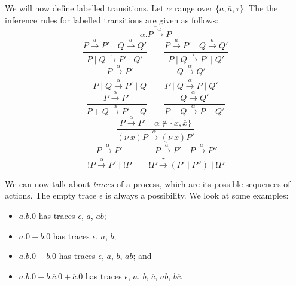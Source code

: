 \documentclass[a4paper, openany]{memoir}
\theoremstyle{definition}
\begin{document}
    We will now define labelled transitions. Let $\alpha$ range over $\{a, \overline{a}, \tau\}$. The the inference rules for labelled transitions are given as follows:
    \[\overline{\alpha.P \xrightarrow{\alpha} P}\]
    \[\frac{P \xrightarrow{a} P' \quad Q \xrightarrow{\overline{a}} Q'}{P \mid Q \xrightarrow{\tau} P' \mid Q'} \qquad \frac{P \xrightarrow{\overline{a}} P' \quad Q \xrightarrow{a} Q'}{P \mid Q \xrightarrow{\tau} P' \mid Q'}\]
    \[\frac{P \xrightarrow{\alpha} P'}{P \mid Q \xrightarrow{\alpha} P' \mid Q} \qquad \frac{Q \xrightarrow{\alpha} Q'}{P \mid Q \xrightarrow{\alpha} P \mid Q'}\]
    \[\frac{P \xrightarrow{\alpha} P'}{P + Q \xrightarrow{\alpha} P' + Q} \qquad \frac{Q \xrightarrow{\alpha} Q'}{P + Q \xrightarrow{\alpha} P + Q'}\]
    \[\frac{P \xrightarrow{\alpha} P' \quad \alpha \not\in \{x, \overline{x}\}}{(\nu \ x)P \xrightarrow{\alpha} (\nu \ x)P'}\]
    \[\frac{P \xrightarrow{\alpha} P'}{!P \xrightarrow{\alpha} P' \mid !P} \qquad \frac{P \xrightarrow{\overline{a}} P' \quad P \xrightarrow{a} P''}{!P \xrightarrow{\tau} (P' \mid P'') \mid !P}\]

    We can now talk about \emph{traces} of a process, which are its possible sequences of actions. The empty trace $\epsilon$ is always a possibility. We look at some examples:
    \begin{itemize}
        \item $a.b.0$ has traces $\epsilon$, $a$, $ab$;
        \item $a.0 + b.0$ has traces $\epsilon$, $a$, $b$;
        \item $a.\overline{b}.0 + b.0$ has traces $\epsilon$, $a$, $b$, $a\overline{b}$; and
        \item $a.b.0 + b.\overline{c}.0 + \overline{c}.0$ has traces $\epsilon$, $a$, $b$, $\overline{c}$, $ab$, $b\overline{c}$.
    \end{itemize}
\end{document}
